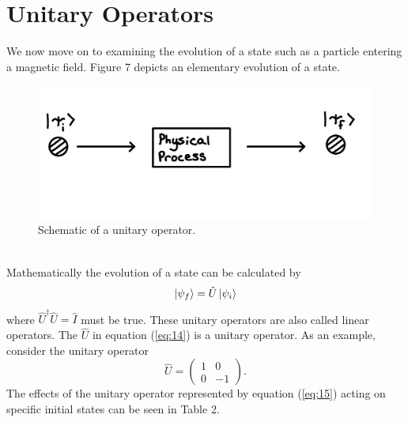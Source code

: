 \documentclass[twocolumn]{article}
\begin{document}
\section*{Unitary Operators}
We now move on to examining the evolution of a state such as a particle entering a magnetic field. Figure 7 depicts an elementary evolution of a state.
\begin{figure}[htpb]
\begin{center}
\includegraphics[width=0.90\linewidth]{Unitary-Operator.PNG}
\caption{Schematic of a unitary operator.}
\end{center}
\end{figure}\\
Mathematically the evolution of a state can be calculated by
\begin{equation}\label{eq:14}
\ket{\psi_f}=\hat{U}\ket{\psi_i}
\end{equation}
where $\hat{U}^{\dagger}\hat{U}=\hat{I}$ must be true. These unitary operators are also called linear operators.  The $\hat{U}$ in equation (\ref{eq:14}) is a unitary operator. As an example, consider the unitary operator
\begin{equation}\label{eq:15}
\hat{U}=
\begin{pmatrix}
1 & 0 \\
0 & -1
\end{pmatrix}.
\end{equation}
The effects of the unitary operator represented by equation (\ref{eq:15}) acting on specific initial states can be seen in Table 2.
\end{document}
